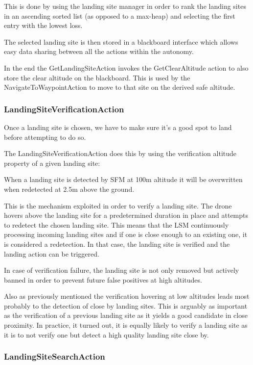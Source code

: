This is done by using the landing site manager in order to rank the landing sites in an ascending sorted list (as opposed to a max-heap) and selecting the first entry with the lowest loss.

The selected landing site is then stored in a blackboard interface which allows easy data sharing between all the actions within the autonomy.

In the end the GetLandingSiteAction invokes the GetClearAltitude action to also store the clear altitude on the blackboard. This is used by the NavigateToWaypointAction to move to that site on the derived safe altitude.

\subsubsection{LandingSiteVerificationAction}

Once a landing site is chosen, we have to make sure it's a good spot to land before attempting to do so. 

The LandingSiteVerificationAction does this by using the verification altitude property of a given landing site:

When a landing site is detected by SFM at 100m altitude it will be overwritten when redetected at 2.5m above the ground. 

This is the mechanism exploited in order to verify a landing site. The drone hovers above the landing site for a predetermined duration in place and attempts to redetect the chosen landing site. This means that the LSM continuously processing incoming landing sites and if one is close enough to an existing one, it is considered a redetection. In that case, the landing site is verified and the landing action can be triggered.

In case of verification failure, the landing site is not only removed but actively banned in order to prevent future false positives at high altitudes.

Also as previously mentioned the verification hovering at low altitudes leads most probably to the detection of close by landing sites. This is arguably as important as the verification of a previous landing site as it yields a good candidate in close proximity. In practice, it turned out,  it is equally likely to verify a landing site as it is to not verify one but detect a high quality landing site close by.

\subsubsection{LandingSiteSearchAction}

